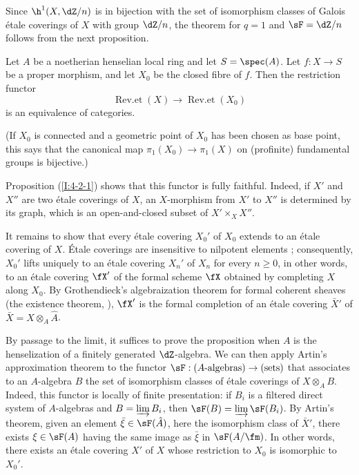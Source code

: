 Since $\h^1(X,\dZ/n)$ is in bijection with the set of isomorphism classes
of Galois étale coverings of $X$ with group $\dZ/n$, the theorem for
$q=1$ and $\sF=\dZ/n$ follows from the next proposition.

\begin{proposition}\label{I:4-2-2}
Let $A$ be a noetherian henselian local ring and let $S=\spec(A)$. Let
$f:X\to S$ be a proper morphism, and let $X_0$ be the closed fibre of $f$. Then
the restriction functor
\[
  \operatorname{Rev.et}(X) \to \operatorname{Rev.et}(X_0)
\]
is an equivalence of categories.
\end{proposition}

(If $X_0$ is connected and a geometric point of $X_0$ has been chosen
as base point, this says that the canonical map
$\pi_1(X_0)\to\pi_1(X)$ on (profinite) fundamental groups is bijective.)

Proposition (\ref{I:4-2-1}) shows that this functor is fully faithful.
Indeed, if $X'$ and $X''$ are two étale coverings of $X$, an
$X$-morphism from $X'$ to $X''$ is determined by its graph, which is an
open-and-closed subset of $X'\times_XX''$.

It remains to show that every étale covering $X_0'$ of $X_0$ extends to
an étale covering of $X$. Étale coverings are insensitive to nilpotent
elements ; consequently, $X_0'$ lifts uniquely to an
étale covering $X_n'$ of $X_n$ for every $n\geqslant0$, in other words,
to an étale covering $\fX'$ of the formal scheme $\fX$ obtained by
completing $X$ along $X_0$. By Grothendieck's algebraization theorem for
formal coherent sheaves (the existence theorem, ),
$\fX'$ is the formal completion of an étale covering $\bar X'$ of
$\bar X=X\otimes_A\hat A$.

By passage to the limit, it suffices to prove the proposition when $A$ is
the henselization of a finitely generated $\dZ$-algebra. We can then
apply Artin's approximation theorem to the functor
$\sF:(\textnormal{$A$-algebras})\to(\textnormal{sets})$ that associates
to an $A$-algebra $B$ the set of isomorphism classes of étale coverings
of $X\otimes_AB$. Indeed, this functor is locally of finite presentation:
if $B_i$ is a filtered direct system of $A$-algebras and
$B=\varinjlim B_i$, then $\sF(B)=\varinjlim\sF(B_i)$. By Artin's
theorem, given an element $\bar\xi\in\sF(\hat A)$, here the isomorphism class
of $\bar X'$, there exists $\xi\in\sF(A)$ having the same image as
$\bar\xi$ in $\sF(A/\fm)$. In other words, there exists an étale
covering $X'$ of $X$ whose restriction to $X_0$ is isomorphic to
$X_0'$.


